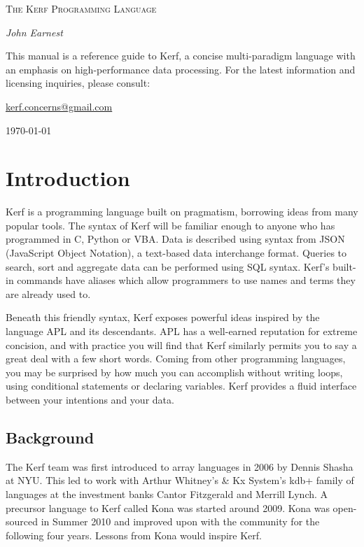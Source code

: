 \documentclass{article}
\begin{document}
\begin{titlepage}
	\centering
	{\scshape\LARGE The Kerf Programming Language \par}
	\vspace{1cm}
	{\Large\itshape John Earnest\par}
	\vspace{1.5cm}
	\vfill
	This manual is a reference guide to Kerf, a concise multi-paradigm language with an emphasis on high-performance data processing. For the latest information and licensing inquiries, please consult:
	\begin{center}
		\url{kerf.concerns@gmail.com}
	\end{center}
	\vfill
	{\large \today\par}
\end{titlepage}

\tableofcontents
\newpage

\section{Introduction}
Kerf is a programming language built on pragmatism, borrowing ideas from many popular tools. The syntax of Kerf will be familiar enough to anyone who has programmed in C, Python or VBA. Data is described using syntax from JSON (JavaScript Object Notation), a text-based data interchange format. Queries to search, sort and aggregate data can be performed using SQL syntax. Kerf's built-in commands have aliases which allow programmers to use names and terms they are already used to.

\vspace{0.5cm}

Beneath this friendly syntax, Kerf exposes powerful ideas inspired by the language APL and its descendants. APL has a well-earned reputation for extreme concision, and with practice you will find that Kerf similarly permits you to say a great deal with a few short words. Coming from other programming languages, you may be surprised by how much you can accomplish without writing loops, using conditional statements or declaring variables. Kerf provides a fluid interface between your intentions and your data.

\subsection{Background}
The Kerf team was first introduced to array languages in 2006 by Dennis Shasha at NYU. This led to work with Arthur Whitney's \& Kx System's kdb+ family of languages at the investment banks Cantor Fitzgerald and Merrill Lynch. A precursor language to Kerf called Kona was started around 2009. Kona was open-sourced in Summer 2010 and improved upon with the community for the following four years. Lessons from Kona would inspire Kerf.
\end{document}
